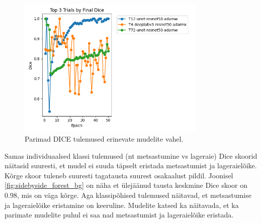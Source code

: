 \begin{figure}[H]
    \centering
    \includegraphics[width=0.8\textwidth]{figures/top3_dice.png}
    \caption{Parimad DICE tulemused erinevate mudelite vahel.}
    \label{fig:segmentation_results}
\end{figure}

Samas individuaalsed klassi tulemused (nt metsastumine vs lageraie) Dice skoorid näitasid suuresti, et mudel ei suuda
täpselt eristada metsastumist ja lageraielõike. Kõrge skoor tuleneb suuresti tagatausta suurest osakaalust pildil. Joonisel \ref{fig:sidebyside_forest_bg} on näha et ülejäänud tausta keskmine Dice skoor on 0.98, mis on väga kõrge. Aga klassipõhised tulemused näitavad, et metsastumise ja lageraielõike eristamine on keeruline. Mudelite katsed ka näitavada, et ka parimate mudelite puhul ei saa nad metsastumist ja lageraielõike eristada.

